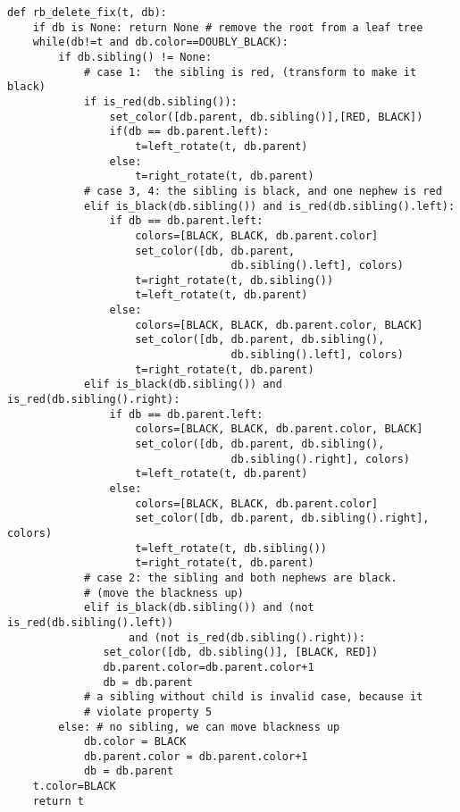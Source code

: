 \documentclass{article}
\begin{document}
\begin{lstlisting}
def rb_delete_fix(t, db):
    if db is None: return None # remove the root from a leaf tree
    while(db!=t and db.color==DOUBLY_BLACK):
        if db.sibling() != None:
            # case 1:  the sibling is red, (transform to make it black)
            if is_red(db.sibling()): 
                set_color([db.parent, db.sibling()],[RED, BLACK])
                if(db == db.parent.left):
                    t=left_rotate(t, db.parent)
                else:
                    t=right_rotate(t, db.parent)
            # case 3, 4: the sibling is black, and one nephew is red
            elif is_black(db.sibling()) and is_red(db.sibling().left): 
                if db == db.parent.left:
                    colors=[BLACK, BLACK, db.parent.color]
                    set_color([db, db.parent, 
                                   db.sibling().left], colors)
                    t=right_rotate(t, db.sibling())
                    t=left_rotate(t, db.parent)
                else:
                    colors=[BLACK, BLACK, db.parent.color, BLACK]
                    set_color([db, db.parent, db.sibling(), 
                                   db.sibling().left], colors)
                    t=right_rotate(t, db.parent)
            elif is_black(db.sibling()) and is_red(db.sibling().right):
                if db == db.parent.left:
                    colors=[BLACK, BLACK, db.parent.color, BLACK]
                    set_color([db, db.parent, db.sibling(), 
                                   db.sibling().right], colors)
                    t=left_rotate(t, db.parent)
                else:
                    colors=[BLACK, BLACK, db.parent.color]
                    set_color([db, db.parent, db.sibling().right], colors)
                    t=left_rotate(t, db.sibling())
                    t=right_rotate(t, db.parent)
            # case 2: the sibling and both nephews are black. 
            # (move the blackness up)
            elif is_black(db.sibling()) and (not is_red(db.sibling().left)) 
                   and (not is_red(db.sibling().right)):
               set_color([db, db.sibling()], [BLACK, RED])
               db.parent.color=db.parent.color+1
               db = db.parent
            # a sibling without child is invalid case, because it 
            # violate property 5
        else: # no sibling, we can move blackness up
            db.color = BLACK
            db.parent.color = db.parent.color+1
            db = db.parent
    t.color=BLACK
    return t
\end{lstlisting}
\end{document}
